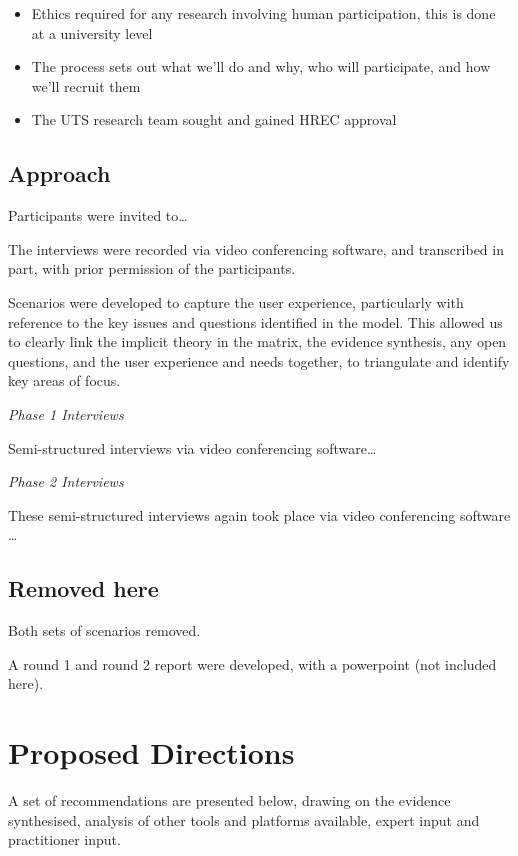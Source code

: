 \documentclass[
]{book}
\providecommand{\tightlist}{%
  \setlength{\itemsep}{0pt}\setlength{\parskip}{0pt}}
\begin{document}
\begin{itemize}
\tightlist
\item
  Ethics required for any research involving human participation, this is done at a university level
\item
  The process sets out what we'll do and why, who will participate, and how we'll recruit them
\item
  The UTS research team sought and gained HREC approval
\end{itemize}

\hypertarget{approach}{%
\section{Approach}\label{approach}}

Participants were invited to\ldots{}

The interviews were recorded via video conferencing software, and transcribed in part, with prior permission of the participants.

Scenarios were developed to capture the user experience, particularly with reference to the key issues and questions identified in the model. This allowed us to clearly link the implicit theory in the matrix, the evidence synthesis, any open questions, and the user experience and needs together, to triangulate and identify key areas of focus.

\emph{Phase 1 Interviews}

Semi-structured interviews via video conferencing software\ldots{}

\emph{Phase 2 Interviews}

These semi-structured interviews again took place via video conferencing software \ldots{}

\hypertarget{removed-here}{%
\section{Removed here}\label{removed-here}}

Both sets of scenarios removed.

A round 1 and round 2 report were developed, with a powerpoint (not included here).

\hypertarget{proposed-directions}{%
\chapter{Proposed Directions}\label{proposed-directions}}

A set of recommendations are presented below, drawing on the evidence synthesised, analysis of other tools and platforms available, expert input and practitioner input.
\end{document}
